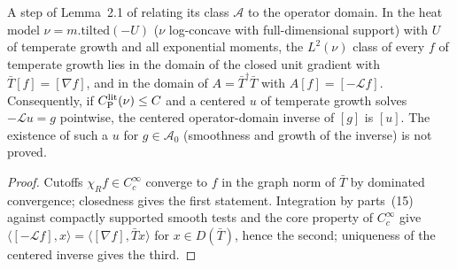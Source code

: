 \begin{lemma}
  \label{lem:bkl-generator-temperate}
  \leanok
  A step of Lemma~2.1 of \cite{BizeulKlartagLehec2026} relating its class $\mathcal A$ to the operator
  domain.  In the heat model $\nu=m.\mathrm{tilted}(-U)$ ($\nu$ log-concave with full-dimensional
  support) with $U$ of temperate growth and all exponential moments, the $L^2(\nu)$ class of every $f$
  of temperate growth lies in the domain of the closed unit gradient with $\bar T[f]=[\nabla f]$, and in
  the domain of $A=\bar T^\dagger\bar T$ with $A[f]=[-\mathcal Lf]$.  Consequently, if $C_{\mathrm P}^{\mathrm{lit}}(\nu)\le C$
  and a centered $u$ of temperate growth solves $-\mathcal Lu=g$ pointwise, the centered operator-domain
  inverse of $[g]$ is $[u]$.  The existence of such a $u$ for $g\in\mathcal A_0$ (smoothness and growth of
  the inverse) is not proved.
\end{lemma}
\begin{proof}
  \leanok
  Cutoffs $\chi_R f\in C_c^\infty$ converge to $f$ in the graph norm of $\bar T$ by dominated convergence;
  closedness gives the first statement.  Integration by parts~(15) against compactly supported smooth
  tests and the core property of $C_c^\infty$ give $\langle[-\mathcal Lf],x\rangle=\langle[\nabla f],\bar Tx\rangle$
  for $x\in D(\bar T)$, hence the second; uniqueness of the centered inverse gives the third.
\end{proof}

